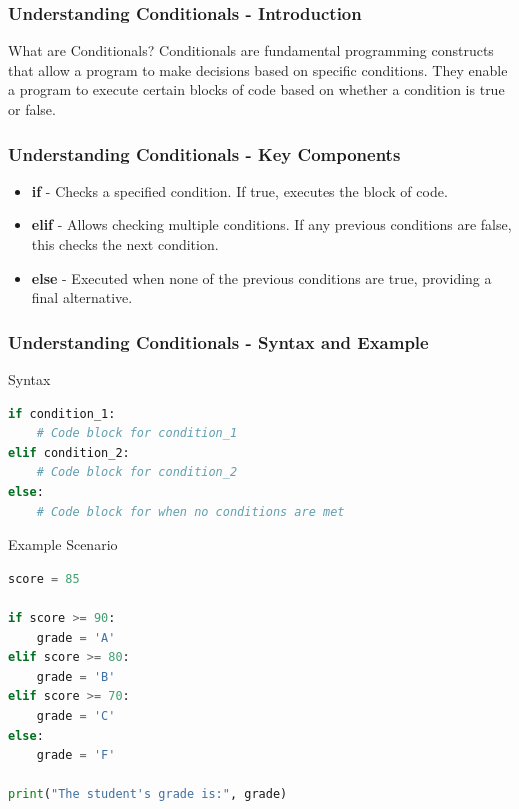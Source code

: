 \documentclass{beamer}
\begin{document}
\begin{frame}[fragile]
    \frametitle{Understanding Conditionals - Introduction}
    \begin{block}{What are Conditionals?}
        Conditionals are fundamental programming constructs that allow a program to make decisions based on specific conditions. They enable a program to execute certain blocks of code based on whether a condition is true or false.
    \end{block}
\end{frame}

\begin{frame}[fragile]
    \frametitle{Understanding Conditionals - Key Components}
    \begin{itemize}
        \item \textbf{if} - Checks a specified condition. If true, executes the block of code.
        \item \textbf{elif} - Allows checking multiple conditions. If any previous conditions are false, this checks the next condition.
        \item \textbf{else} - Executed when none of the previous conditions are true, providing a final alternative.
    \end{itemize}
\end{frame}

\begin{frame}[fragile]
    \frametitle{Understanding Conditionals - Syntax and Example}
    \begin{block}{Syntax}
        \begin{lstlisting}[language=Python]
if condition_1:
    # Code block for condition_1
elif condition_2:
    # Code block for condition_2
else:
    # Code block for when no conditions are met
        \end{lstlisting}
    \end{block}

    \begin{block}{Example Scenario}
        \begin{lstlisting}[language=Python]
score = 85

if score >= 90:
    grade = 'A'
elif score >= 80:
    grade = 'B'
elif score >= 70:
    grade = 'C'
else:
    grade = 'F'

print("The student's grade is:", grade)
        \end{lstlisting}
    \end{block}
\end{frame}
\end{document}
